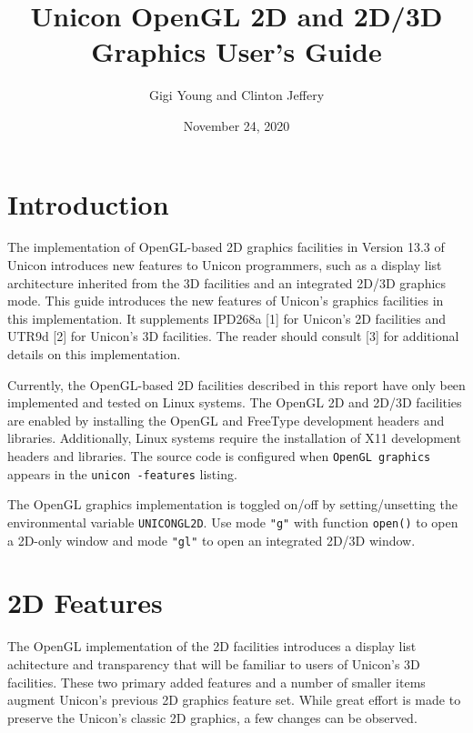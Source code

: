 \documentclass[letterpaper,12pt]{article}
\title{Unicon OpenGL 2D and 2D/3D Graphics User's Guide}
\author{Gigi Young and Clinton Jeffery}
\date{November 24, 2020}
\begin{document}
\maketitle

\section{Introduction}

The implementation of OpenGL-based 2D graphics facilities in Version
13.3 of Unicon introduces new features to Unicon programmers, such as
a display list architecture inherited from the 3D facilities and an
integrated 2D/3D graphics mode.  This guide introduces the new
features of Unicon's graphics facilities in this implementation. It
supplements IPD268a [1] for Unicon's 2D facilities and UTR9d [2] for
Unicon's 3D facilities. The reader should consult [3] for additional
details on this implementation.

Currently, the OpenGL-based 2D facilities described in this report
have only been implemented and tested on Linux systems.
The OpenGL 2D and 2D/3D facilities are enabled by installing the OpenGL and 
FreeType development headers and libraries. 
Additionally, Linux systems require the installation of X11 development headers 
and libraries.
The source code is configured when \texttt{OpenGL graphics} appears in 
the \texttt{unicon -features} listing.

The OpenGL graphics implementation is toggled on/off by setting/unsetting  
the environmental variable \texttt{UNICONGL2D}. Use mode \texttt{"g"} with
function \texttt{open()} to open a 2D-only window and mode \texttt{"gl"}
to open an integrated 2D/3D window.

\newpage
\section{2D Features}

The OpenGL implementation of the 2D facilities introduces a display list
achitecture and transparency that will be familiar to users of
Unicon's 3D facilities. These two primary added features and a number of
smaller items augment Unicon's previous 2D graphics feature set. While
great effort is made to preserve the Unicon's classic 2D graphics, a
few changes can be observed.
\end{document}
